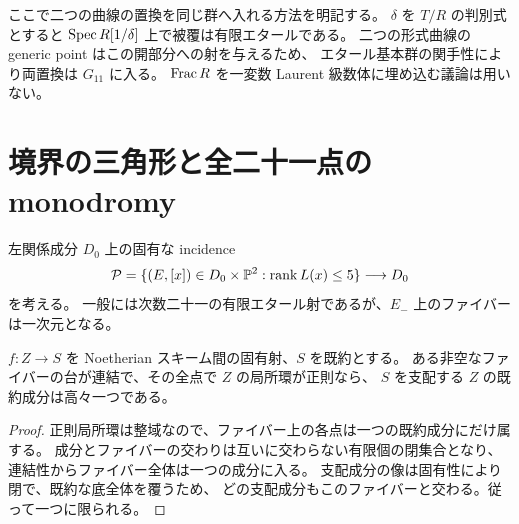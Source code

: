ここで二つの曲線の置換を同じ群へ入れる方法を明記する。
$\delta$ を $T/R$ の判別式とすると $\operatorname{Spec} R[1/\delta]$ 上で被覆は有限エタールである。
二つの形式曲線の generic point はこの開部分への射を与えるため、
エタール基本群の関手性\cite{Stacks}により両置換は $G_{11}$ に入る。
$\operatorname{Frac} R$ を一変数 Laurent 級数体に埋め込む議論は用いない。

\section{境界の三角形と全二十一点の monodromy}
\label{sec:global-monodromy}
左関係成分 $D_0$ 上の固有な incidence
\[
 \mathcal P=\{(E,[x])\in D_0\times\mathbb P^2:\operatorname{rank} L(x)\le5\}
 \longrightarrow D_0
\]
を考える。
一般には次数二十一の有限エタール射であるが、$E_-$ 上のファイバーは一次元となる。

\begin{lemma}[連結な特殊ファイバーと正則な全空間]\label{lem:connected-fibre}
$f:Z\to S$ を Noetherian スキーム間の固有射、$S$ を既約とする。
ある非空なファイバーの台が連結で、その全点で $Z$ の局所環が正則なら、
$S$ を支配する $Z$ の既約成分は高々一つである。
\end{lemma}
\begin{proof}
正則局所環は整域なので、ファイバー上の各点は一つの既約成分にだけ属する。
成分とファイバーの交わりは互いに交わらない有限個の閉集合となり、
連結性からファイバー全体は一つの成分に入る。
支配成分の像は固有性により閉で、既約な底全体を覆うため、
どの支配成分もこのファイバーと交わる。従って一つに限られる。
\end{proof}

